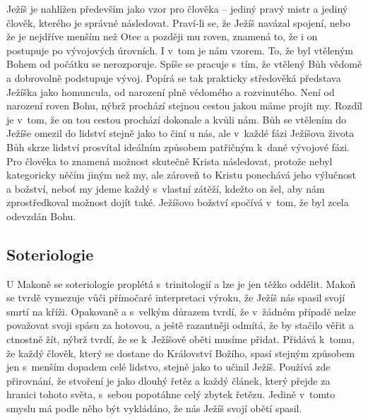 Ježíš je nahlížen především jako vzor pro člověka -- jediný pravý mistr a jediný
člověk, kterého je správné následovat. Praví-li se, že Ježíš navázal spojení,
nebo že je nejdříve menším než Otec a později mu roven, znamená to, že i on
postupuje po vývojových úrovních. I v~tom je nám vzorem. To, že byl vtěleným
Bohem od počátku se nerozporuje. Spíše se pracuje s~tím, že vtělený Bůh vědomě a
dobrovolně podstupuje vývoj. Popírá se tak prakticky středověká představa
Ježíška jako homuncula, od narození plně vědomého a rozvinutého.\cite{zuffi2003gospel}
Není od narození roven Bohu, nýbrž prochází stejnou cestou jakou máme projít my.
Rozdíl je v~tom, že on tou cestou prochází dokonale a kvůli nám. Bůh se vtělením
do Ježíše omezil do lidství stejně jako to činí u nás, ale v~každé fázi Ježíšova
života Bůh skrze lidství prosvítal ideálním způsobem patřičným k~dané vývojové
fázi. Pro člověka to znamená možnost skutečně Krista následovat, protože nebyl
kategoricky něčím jiným než my, ale zároveň to Kristu ponechává jeho výlučnost a
božství, neboť my jdeme každý s~vlastní zátěží, kdežto on šel, aby nám
zprostředkoval možnost dojít také.
Ježíšovo božství spočívá v~tom, že byl zcela odevzdán Bohu. 

\subsection{Soteriologie}

U Makoně se soteriologie proplétá s~trinitologií a lze je jen těžko oddělit.
Makoň se tvrdě vymezuje vůči přímočaré interpretaci výroku, že Ježíš nás spasil
svojí smrtí na kříži. Opakovaně a s~velkým důrazem tvrdí, že v~žádném případě
nelze považovat svoji spásu za hotovou, a ještě razantněji odmítá, že by stačilo
věřit a ctnostně žít, nýbrž tvrdí, že se k~Ježíšově oběti musíme
přidat. Přidává k~tomu, že každý člověk, který se dostane do
Království Božího, spasí stejným způsobem jen s~menším dopadem celé lidstvo,
stejně jako to učinil Ježíš. Používá zde
přirovnání, že stvoření je jako dlouhý řetěz a každý článek, který přejde za
hranici tohoto světa, s~sebou popotáhne celý zbytek řetězu.
Jedině v~tomto smyslu má podle něho být vykládáno, že nás Ježíš svojí obětí
spasil.

